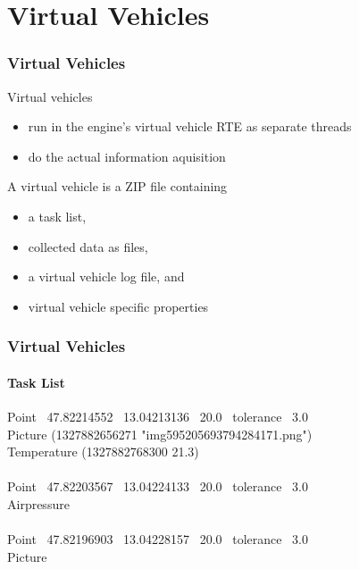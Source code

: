 \documentclass{beamer}
\begin{document}
\section{Virtual Vehicles}
\begin{frame}\frametitle{Virtual Vehicles}

Virtual vehicles
\begin{itemize}
  \item run in the engine's virtual vehicle RTE as separate threads
  \item do the actual information aquisition
\end{itemize}

\vspace{0.5cm}
\pause

A virtual vehicle is a ZIP file containing
\begin{itemize}
  \item a task list,
  \item collected data as files,
  \item a virtual vehicle log file, and
  \item virtual vehicle specific properties
\end{itemize}

\end{frame}

\begin{frame}\frametitle{Virtual Vehicles}\framesubtitle{Task List}
Point  ~47.82214552  ~13.04213136  ~20.0  ~tolerance  ~3.0 \\
Picture (\textcolor{zeit}{1327882656271} \textcolor{wert}{"img595205693794284171.png"}) \\
Temperature (\textcolor{zeit}{1327882768300} \textcolor{wert}{21.3}) \\
\quad \\
Point  ~47.82203567  ~13.04224133  ~20.0  ~tolerance  ~3.0 \\
Airpressure \\
\quad \\
Point  ~47.82196903  ~13.04228157  ~20.0  ~tolerance  ~3.0 \\
Picture
\end{frame}
\end{document}
